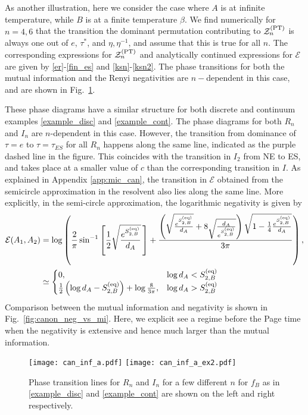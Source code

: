 \documentclass[a4paper,11pt]{article}
\newcommand\half{{\ensuremath{\frac{1}{2}}}}
\def\b{{\beta}}
\newcommand\ha{{\half}}
\newcommand\sE{{\ensuremath{{\mathcal E}}}}
\newcommand\sZ{{\mathcal Z}}
\begin{document}
\begin{enumerate}
As another illustration, here we consider the case where $A$ is at infinite temperature, while $B$ is at a finite temperature $\b$. 
We find numerically for $n=4, 6$ that the transition the dominant permutation contributing to $\sZ_n^{\rm (PT)}$ is always one out of $e$, $\tau^{\ast}$, and $\eta, \eta^{-1}$, and assume that this is true for all $n$. The corresponding expressions for $\sZ_n^{\rm(PT)}$ and analytically continued expressions for $\sE$ are given by \eqref{er}-\eqref{fin_es} and \eqref{ksn}-\eqref{ksn2}. The phase transitions for both the mutual information and the Renyi negativities are $n-$dependent in this case, and are shown in Fig.~\ref{fig:can_infa}. 

These phase diagrams have a similar structure for both discrete and continuum examples \eqref{example_disc} and \eqref{example_cont}. The phase diagrams for both $R_n$ and $I_n$ are $n$-dependent in this case. However, the transition from dominance of $\tau=e$ to $\tau=\tau_{ES}$ for all $R_n$ happens along the same line, indicated as the purple dashed line in the figure. This coincides with the transition in $I_2$ from NE to ES, and takes place at a smaller value of $c$ than the corresponding transition in $I$. As explained in Appendix \ref{app:mic_can}, the transition in $\sE$ obtained from the semicircle approximation in the resolvent also lies along the same line. More explicitly, in the semi-circle approximation, the logarithmic negativity is given by
\begin{align}
 {\cal E}(A_1,A_2) &=
\log \left(\frac{2}{\pi} \sin^{-1}\left[ \ha \sqrt{\frac{e^{S^{\rm (eq)}_{2,B}}}{d_A}} \, \right]+
    \frac{ \left(\sqrt{\frac{e^{S^{\rm (eq)}_{2,B}}}{d_A}}+8 \sqrt{\frac{d_A}{e^{S^{\rm (eq)}_{2,B}}}} \right) \sqrt{ 1- \frac{1}{4}{\frac{e^{S^{\rm (eq)}_{2,B}}}{d_A}} }}{3\pi }
    \right), 
    \\
    &\simeq
    \begin{cases}
      0 , & \log d_A < S^{\rm (eq)}_{2, B}
      \\
      \frac{1}{2}\left(\log d_A - S^{\rm (eq)}_{2,B}\right) + \log \frac{8}{3\pi}, & \log d_A > S^{\rm (eq)}_{2, B}
    \end{cases}
\label{eq:logneg}
\end{align}
Comparison between the mutual information and negativity is shown in Fig.~\ref{fig:canon_neg_vs_mi}. Here, we explicit see a regime before the Page time when the negativity is extensive and hence much larger than the mutual information.

\begin{figure}[!h] 
\begin{center}
\texttt{[image: can\_inf\_a.pdf]}
\texttt{[image: can\_inf\_a\_ex2.pdf]}
\end{center}
\caption{Phase transition lines for $R_n$ and $I_n$ for a few different $n$ for $f_B$ as in \eqref{example_disc} and \eqref{example_cont} are shown on the left and right respectively.}
\label{fig:can_infa}
\end{figure} 




\end{enumerate}
\end{document}
